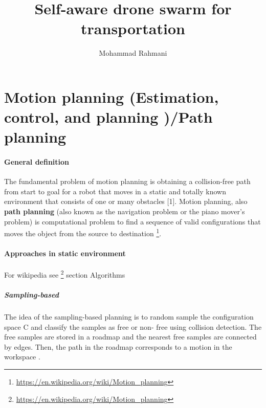 \documentclass{article}
\begin{document}
	
	\title{Self-aware drone swarm for transportation}
	\author{Mohammad Rahmani}
	\date{}
	\maketitle
	
	\section{Motion planning (Estimation, control, and planning )/Path planning}
		\paragraph{General definition}
		The fundamental problem of motion planning is obtaining a collision-free path from start to goal for a robot that moves in a
		static and totally known environment that consists of one or many obstacles  \cite{mohanan-2018-a-survey-of-robotic-motion-planning-in-dynamic-environments}[1].
		Motion planning, also \textbf{path planning} (also known as the navigation problem or the piano mover's problem) is computational problem to find a sequence of valid configurations that moves the object from the source to destination \footnote{\url{https://en.wikipedia.org/wiki/Motion_planning}}.
		
		\paragraph{Approaches in static environment}
			For wikipedia see \footnote{\url{https://en.wikipedia.org/wiki/Motion_planning}} section Algorithms
			\subparagraph{Sampling-based} 
			The idea of the sampling-based planning is to random sample the configuration space C and classify the samples as free or non-	free using collision detection. The free samples are stored in a roadmap and the nearest free samples are connected by edges.
			Then, the path in the roadmap corresponds to a motion in the workspace \cite{spurny-2019-cooperative-transport-of-large-objects-by-a-pair-of-unmanned-aerial-systems-using-sampling-based-motion-planning}.
			
\end{document}
